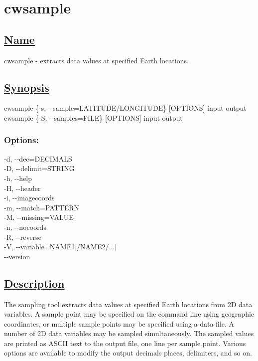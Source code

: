 \newpage
\section{cwsample} \hypertarget{cwsample}{}
\subsection*{\underline{Name}}


   cwsample - extracts data values at specified Earth locations.  
\subsection*{\underline{Synopsis}}


  cwsample \{-s, -{-}sample=LATITUDE/LONGITUDE\} [OPTIONS] input output \\ 
 cwsample \{-S, -{-}samples=FILE\} [OPTIONS] input output \\ 

\subsubsection*{Options:}


  -d, -{-}dec=DECIMALS \\ 
 -D, -{-}delimit=STRING \\ 
 -h, -{-}help \\ 
 -H, -{-}header \\ 
 -i, -{-}imagecoords \\ 
 -m, -{-}match=PATTERN \\ 
 -M, -{-}missing=VALUE \\ 
 -n, -{-}nocoords \\ 
 -R, -{-}reverse \\ 
 -V, -{-}variable=NAME1[/NAME2/...] \\ 
 -{-}version \\ 

\subsection*{\underline{Description}}


  The sampling tool extracts data values at specified Earth locations from 2D data variables. A sample point may be specified on the command line using geographic coordinates, or multiple sample points may be specified using a data file. A number of 2D data variables may be sampled simultaneously. The sampled values are printed as ASCII text to the output file, one line per sample point. Various options are available to modify the output decimals places, delimiters, and so on. 

